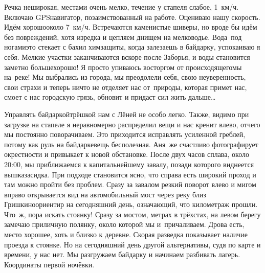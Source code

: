Речка неширокая, местами очень мелко, течение у стапеля слабое, 1~км/ч. Включаю GPS\sdash навигатор, позаимствованный на работе. Оцениваю нашу скорость. Идём хорошо\mdash около 7~км/ч. Встречаются каменистые шиверы, но вроде бы идём без повреждений, хотя изредка и цепляем днищем на мелководье. Вода~под ногами\mdash это стекает с бахил химзащиты, когда залезаешь в байдарку, успокаиваю я себя. Мелкие участки заканчиваются вскоре после Заборья, и воды становится заметно больше\mdash хорошо! Я просто упиваюсь восторгом от происходящего\mdash мы на~реке! Мы выбрались из города, мы преодолели себя, свою неуверенность, свои страхи и теперь ничто не отделяет нас от~природы, которая примет нас, смоет с нас городскую грязь, обновит и придаст сил жить дальше\ldots~

Управлять байдаркой\sdash трёшкой нам с Лёней не особо легко. Также, видимо при загрузке на стапеле я неравномерно распределил вещи и нас кренит влево, отчего мы постоянно поворачиваем. Это приходится исправлять усиленной греблей, потому как руль на байдарке\mdash вещь бесполезная. Аня~же счастливо фотографирует окрестности и привыкает к новой обстановке. После двух часов сплава, около 20:00, мы приближаемся к капитальнейшему завалу, позади которого виднеется вышка\sdash засидка. При подходе становится ясно, что справа есть широкий проход и там можно пройти  без проблем. Сразу за завалом резкий поворот влево и мигом вправо открывается вид на автомобильный мост через реку близ Гришкино\mdash ориентир на сегодняшний день, означающий, что километраж прошли. Что~ж, пора искать стоянку! Сразу за мостом, метрах в трёхстах, на левом берегу замечаю приличную полянку, около которой мы и~причаливаем. Дрова есть, место хорошее, хоть и близко к деревне. Скорая разведка показывает наличие проезда к стоянке. Но на сегодняшний день другой альтернативы, судя по карте и времени, у нас нет. Мы разгружаем байдарку и начинаем разбивать лагерь. Координаты первой ночёвки.

